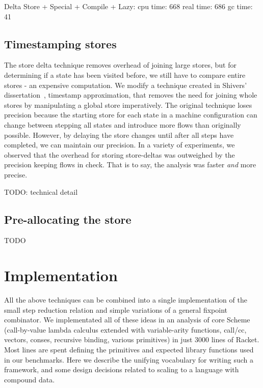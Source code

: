 \documentclass[preprint,onecolumn,9pt]{sigplanconf} %
\begin{document}
Delta Store + Special + Compile + Lazy:
   cpu time: 668 real time: 686 gc time: 41

\subsection{Timestamping stores}

The store delta technique removes overhead of joining large stores,
but for determining if a state has been visited before, we still have
to compare entire stores - an expensive computation.  We modify a
technique created in Shivers'
dissertation~\cite{ianjohnson:Shivers:1991:CFA}, timestamp
approximation, that removes the need for joining whole stores by
manipulating a global store imperatively. The original technique loses
precision because the starting store for each state in a machine
configuration can change between stepping all states and introduce
more flows than originally possible. However, by delaying the store
changes until after all steps have completed, we can maintain our
precision. In a variety of experiments, we observed that the overhead
for storing store-deltas was outweighed by the precision keeping flows
in check. That is to say, the analysis was faster {\it and} more precise.

TODO: technical detail

\subsection{Pre-allocating the store}
TODO

\section{Implementation}
\label{sec:impl}

All the above techniques can be combined into a single implementation
of the small step reduction relation and simple variations of a
general fixpoint combinator. We implementated all of these ideas in an
analysis of core Scheme (call-by-value lambda calculus extended with
variable-arity functions, call/cc, vectors, conses, recursive binding,
various primitives) in just 3000 lines of Racket. Most lines are spent
defining the primitives and expected library functions used in our
benchmarks. Here we describe the unifying vocabulary for writing such
a framework, and some design decisions related to scaling to a
language with compound data.
\end{document}
